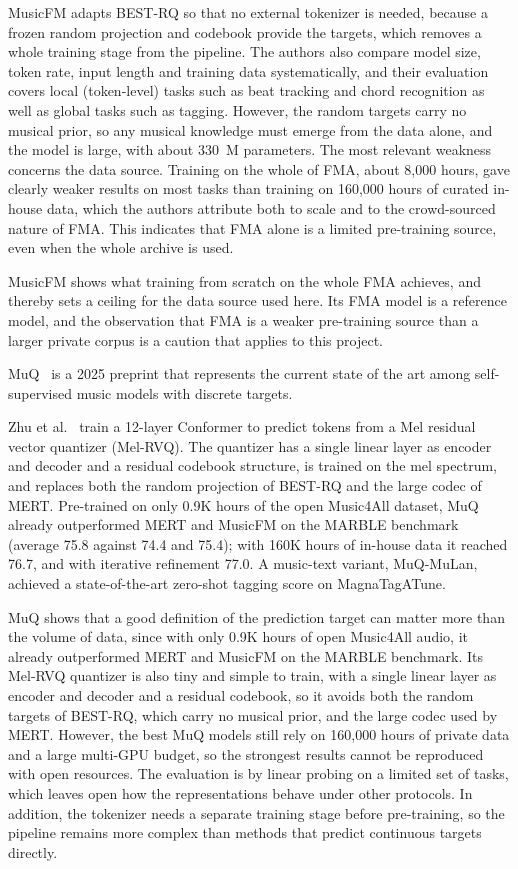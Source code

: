 \documentclass{FastFyp}
\begin{document}
\lrcritical
MusicFM adapts BEST-RQ so that no external tokenizer is needed, because a frozen random projection and codebook provide the targets, which removes a whole training stage from the pipeline. The authors also compare model size, token rate, input length and training data systematically, and their evaluation covers local (token-level) tasks such as beat tracking and chord recognition as well as global tasks such as tagging. However, the random targets carry no musical prior, so any musical knowledge must emerge from the data alone, and the model is large, with about 330~M parameters. The most relevant weakness concerns the data source. Training on the whole of FMA, about 8,000 hours, gave clearly weaker results on most tasks than training on 160,000 hours of curated in-house data, which the authors attribute both to scale and to the crowd-sourced nature of FMA. This indicates that FMA alone is a limited pre-training source, even when the whole archive is used.

\lrrelation
MusicFM shows what training from scratch on the whole FMA achieves, and thereby sets a ceiling for the data source used here. Its FMA model is a reference model, and the observation that FMA is a weaker pre-training source than a larger private corpus is a caution that applies to this project.

MuQ~\cite{ref:Zhu:2025muq} is a 2025 preprint that represents the current state of the art among self-supervised music models with discrete targets.

\lrsummary
Zhu et al.~\cite{ref:Zhu:2025muq} train a 12-layer Conformer to predict tokens from a Mel residual vector quantizer (Mel-RVQ). The quantizer has a single linear layer as encoder and decoder and a residual codebook structure, is trained on the mel spectrum, and replaces both the random projection of BEST-RQ and the large codec of MERT. Pre-trained on only 0.9K hours of the open Music4All dataset, MuQ already outperformed MERT and MusicFM on the MARBLE benchmark (average 75.8 against 74.4 and 75.4); with 160K hours of in-house data it reached 76.7, and with iterative refinement 77.0. A music-text variant, MuQ-MuLan, achieved a state-of-the-art zero-shot tagging score on MagnaTagATune.

\lrcritical
MuQ shows that a good definition of the prediction target can matter more than the volume of data, since with only 0.9K hours of open Music4All audio, it already outperformed MERT and MusicFM on the MARBLE benchmark. Its Mel-RVQ quantizer is also tiny and simple to train, with a single linear layer as encoder and decoder and a residual codebook, so it avoids both the random targets of BEST-RQ, which carry no musical prior, and the large codec used by MERT. However, the best MuQ models still rely on 160,000 hours of private data and a large multi-GPU budget, so the strongest results cannot be reproduced with open resources. The evaluation is by linear probing on a limited set of tasks, which leaves open how the representations behave under other protocols. In addition, the tokenizer needs a separate training stage before pre-training, so the pipeline remains more complex than methods that predict continuous targets directly.
\end{document}
